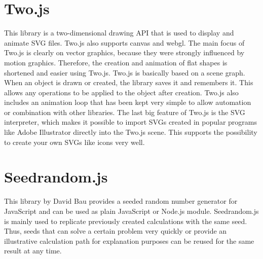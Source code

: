 \section{Two.js}
\label{sec:tecTwo}
This library is a two-dimensional drawing API that is used to display and animate SVG files. Two.js also supports canvas and webgl. The main focus of Two.js is clearly on vector graphics, because they were strongly influenced by motion graphics. Therefore, the creation and animation of flat shapes is shortened and easier using Two.js. Two.js is basically based on a scene graph. When an object is drawn or created, the library saves it and remembers it. This allows any operations to be applied to the object after creation. Two.js also includes an animation loop that has been kept very simple to allow automation or combination with other libraries. The last big feature of Two.js is the SVG interpreter, which makes it possible to import SVGs created in popular programs like Adobe Illustrator directly into the Two.js scene. This supports the possibility to create your own SVGs like icons very well. \cite{TwoJsAuthors2019}

\section{Seedrandom.js}
\label{sec:tecSeed}
This library by David Bau provides a seeded random number generator for JavaScript and can be used as plain JavaScript or Node.js module. Seedrandom.js is mainly used to replicate previously created calculations with the same seed. Thus, seeds that can solve a certain problem very quickly or provide an illustrative calculation path for explanation purposes can be reused for the same result at any time. \cite{Bau2019}

